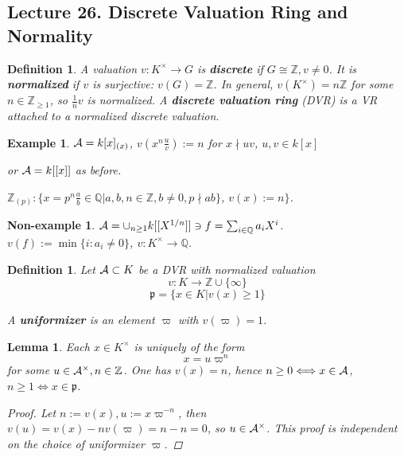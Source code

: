 \documentclass[11pt]{article}
\newtheorem{lemma}[thm]{Lemma}
\newtheorem{dfn}[thm]{Definition}
\newtheorem{ex}[thm]{Example}
\newtheorem{nex}[thm]{Non-example}
\newcommand{\intg}{\mathbb Z}
\newcommand{\ratl}{\mathbb Q}
\newcommand{\scp}{{\mathfrak p}}
\newcommand{\cala}{{\cal A}}
\newcommand{\lrta}{\longrightarrow}
\newcommand{\Llrta}{\Longleftrightarrow}
\begin{document}
\subsection{Lecture 26. Discrete Valuation Ring and Normality}
\begin{dfn}
A valuation $v:K^\times\lrta G$ is \textbf{discrete} if $G\cong \intg, v\neq 0$. It is \textbf{normalized} if $v$ is surjective: $v(G)=\intg$. In general, $v(K^\times)=n\intg$ for some $n\in \intg_{\geq 1}$, so $\frac{1}{n}v$ is normalized. A \textbf{discrete valuation ring} (DVR) is a VR attached to a normalized discrete valuation.
\end{dfn}

\begin{ex}
$\cala=k[x]_{(x)}$, $v(x^n\frac{u}{v}):=n$ for $x\nmid uv$, $u,v\in k[x]$

or $\cala=k[[x]]$ as before.

$\intg_{(p)}:\{x=p^n\frac{a}{b}\in \ratl|a,b,n\in \intg, b\neq 0,p\nmid ab\}$, $v(x):=n\}$.
\end{ex}
\begin{nex}
$\cala=\cup_{n\geq 1}k[[X^{1/n}]]\ni f=\sum_{i\in\ratl}a_i X^{i}$. $v(f):=\min\{i:a_i\neq 0\}$, $v:K^\times\lrta \ratl$.
\end{nex}

\begin{dfn}
Let $\cala\subset K$ be a DVR with normalized valuation
$$
v:K\lrta \intg\cup \{\infty\}
$$
$$
\scp=\{x\in K|v(x)\geq 1\}
$$

A \textbf{uniformizer} is an element $\varpi$ with $v(\varpi)=1$.
\end{dfn}
\begin{lemma}
Each $x\in K^\times$ is uniquely of the form
$$
x=u \varpi^n
$$
for some $u\in \cala^\times, n\in \intg$. One has $v(x)=n$, hence $n\geq 0\Llrta x\in \cala$, $n\geq 1\Llrta x\in \scp$.
\begin{proof}
Let $n:=v(x),u:=x\varpi^{-n}$, then $v(u)=v(x)-n v(\varpi)=n-n=0$, so $u\in \cala^\times$. This proof is independent on the choice of uniformizer $\varpi$.
\end{proof}
\end{lemma}
\end{document}

